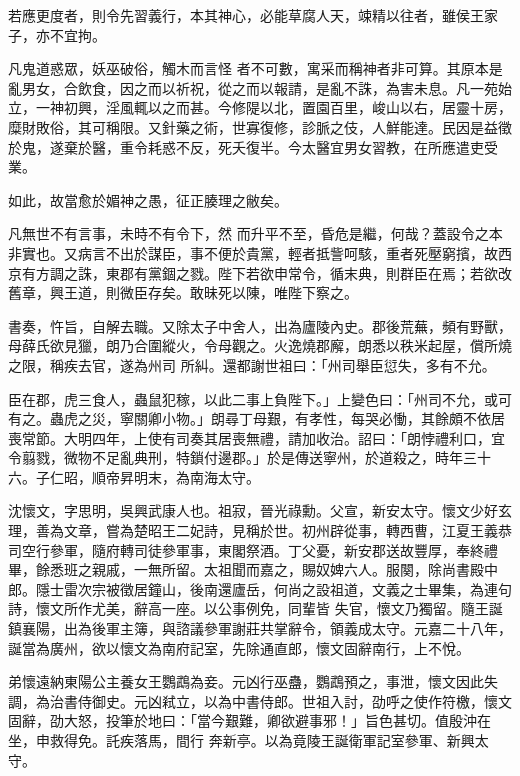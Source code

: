 \begin{pinyinscope}
 若應更度者，則令先習義行，本其神心，必能草腐人天，竦精以往者，雖侯王家子，亦不宜拘。



 凡鬼道惑眾，妖巫破俗，觸木而言怪
 者不可數，寓采而稱神者非可算。其原本是亂男女，合飲食，因之而以祈祝，從之而以報請，是亂不誅，為害未息。凡一苑始立，一神初興，淫風輒以之而甚。今修隄以北，置園百里，峻山以右，居靈十房，糜財敗俗，其可稱限。又針藥之術，世寡復修，診脈之伎，人鮮能達。民因是益徵於鬼，遂棄於醫，重令耗惑不反，死夭復半。今太醫宜男女習教，在所應遣吏受業。



 如此，故當愈於媚神之愚，征正腠理之敝矣。



 凡無世不有言事，未時不有令下，然
 而升平不至，昏危是繼，何哉？蓋設令之本非實也。又病言不出於謀臣，事不便於貴黨，輕者抵訾呵駭，重者死壓窮擯，故西京有方調之誅，東郡有黨錮之戮。陛下若欲申常令，循末典，則群臣在焉；若欲改舊章，興王道，則微臣存矣。敢昧死以陳，唯陛下察之。



 書奏，忤旨，自解去職。又除太子中舍人，出為廬陵內史。郡後荒蕪，頻有野獸，母薛氏欲見獵，朗乃合圍縱火，令母觀之。火逸燒郡廨，朗悉以秩米起屋，償所燒之限，稱疾去官，遂為州司
 所糾。還都謝世祖曰：「州司舉臣愆失，多有不允。



 臣在郡，虎三食人，蟲鼠犯稼，以此二事上負陛下。」上變色曰：「州司不允，或可有之。蟲虎之災，寧關卿小物。」朗尋丁母艱，有孝性，每哭必慟，其餘頗不依居喪常節。大明四年，上使有司奏其居喪無禮，請加收治。詔曰：「朗悖禮利口，宜令翦戮，微物不足亂典刑，特鎖付邊郡。」於是傳送寧州，於道殺之，時年三十六。子仁昭，順帝昇明末，為南海太守。



 沈懷文，字思明，吳興武康人也。祖寂，晉光祿勳。父宣，新安太守。懷文少好玄理，善為文章，嘗為楚昭王二妃詩，見稱於世。初州辟從事，轉西曹，江夏王義恭司空行參軍，隨府轉司徒參軍事，東閣祭酒。丁父憂，新安郡送故豐厚，奉終禮畢，餘悉班之親戚，一無所留。太祖聞而嘉之，賜奴婢六人。服闋，除尚書殿中郎。隱士雷次宗被徵居鐘山，後南還廬岳，何尚之設祖道，文義之士畢集，為連句詩，懷文所作尤美，辭高一座。以公事例免，同輩皆
 失官，懷文乃獨留。隨王誕鎮襄陽，出為後軍主簿，與諮議參軍謝莊共掌辭令，領義成太守。元嘉二十八年，誕當為廣州，欲以懷文為南府記室，先除通直郎，懷文固辭南行，上不悅。



 弟懷遠納東陽公主養女王鸚鵡為妾。元凶行巫蠱，鸚鵡預之，事泄，懷文因此失調，為治書侍御史。元凶弒立，以為中書侍郎。世祖入討，劭呼之使作符檄，懷文固辭，劭大怒，投筆於地曰：「當今艱難，卿欲避事邪！」旨色甚切。值殷沖在坐，申救得免。託疾落馬，間行
 奔新亭。以為竟陵王誕衛軍記室參軍、新興太守。




\end{pinyinscope}
